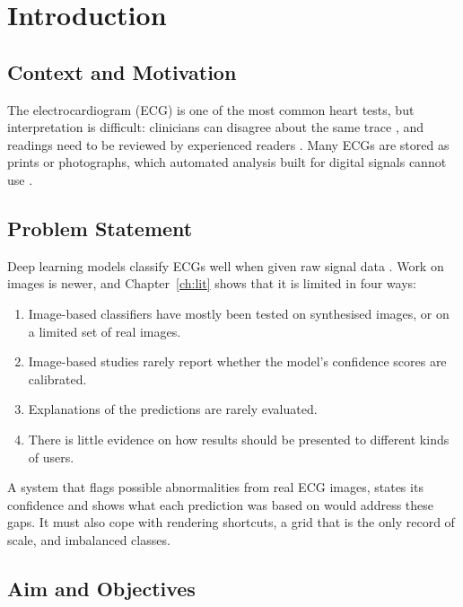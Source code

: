 \chapter{Introduction}
\label{ch:intro}

\section{Context and Motivation}

The electrocardiogram (ECG) is one of the most common heart tests, but interpretation is difficult: clinicians can disagree about the same trace \cite{dhutia_interrater_2017}, and readings need to be reviewed by experienced readers \cite{schlapfer_computer-interpreted_2017}. Many ECGs are stored as prints or photographs, which automated analysis built for digital signals cannot use \cite{shivashankara_ecg-image-kit_2024}.

\section{Problem Statement}
\label{sec:problem}

Deep learning models classify ECGs well when given raw signal data
\cite{hannun_cardiologist_2019,ribeiro_automatic_2020}. Work on images is newer, and
Chapter~\ref{ch:lit} shows that it is limited in four ways:
\begin{enumerate}\setlength{\itemsep}{0pt}\setlength{\parskip}{0pt}
  \item Image-based classifiers have mostly been tested on synthesised images, or on a limited set of real images.
  \item Image-based studies rarely report whether the model's confidence scores are calibrated.
  \item Explanations of the predictions are rarely evaluated.
  \item There is little evidence on how results should be presented to different kinds of users.
\end{enumerate}
A system that flags possible abnormalities from real ECG images, states its confidence and shows what each prediction was based on would address these gaps. It must also cope with rendering shortcuts, a grid that is the only record of scale, and imbalanced classes.

\section{Aim and Objectives}

